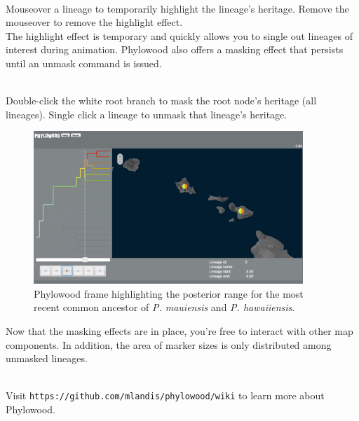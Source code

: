 \noindent \\ \impmark Mouseover a lineage to temporarily highlight the lineage's heritage. Remove the mouseover to remove the highlight effect. \\

The highlight effect is temporary and quickly allows you to single out lineages of interest during animation.
Phylowood also offers a masking effect that persists until an unmask command is issued.

\noindent \\ \impmark Double-click the white root branch to mask the root node's heritage (all lineages). Single click a lineage to unmask that lineage's heritage. \\

\begin{figure}[H]
\centering
\includegraphics[width=4in]{figures/phw_br23}
\caption{Phylowood frame highlighting the posterior range for the most recent common ancestor of {\it P. mauiensis} and {\it P. hawaiiensis}.}
\end{figure}

Now that the masking effects are in place, you're free to interact with other map components.
In addition, the area of marker sizes is only distributed among unmasked lineages.

\noindent \\ \impmark Visit \texttt{https://github.com/mlandis/phylowood/wiki} to learn more about Phylowood.






